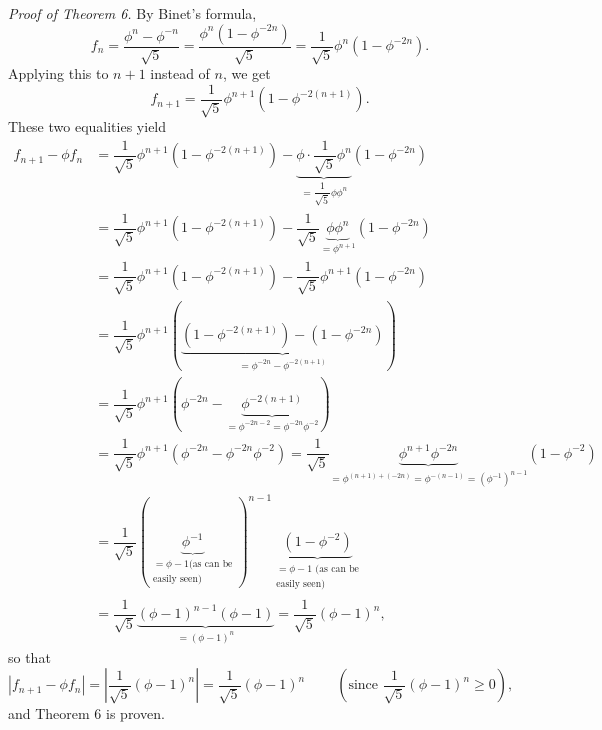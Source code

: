 \documentclass[numbers=enddot,12pt,final,onecolumn,notitlepage]{scrartcl}%
\numberwithin{exer}{section}
\theoremstyle{definition}
\begin{document}
\textit{Proof of Theorem 6.} By Binet's formula,%
\[
f_{n}=\dfrac{\phi^{n}-\phi^{-n}}{\sqrt{5}}=\dfrac{\phi^{n}\left(  1-\phi
^{-2n}\right)  }{\sqrt{5}}=\dfrac{1}{\sqrt{5}}\phi^{n}\left(  1-\phi
^{-2n}\right)  .
\]
Applying this to $n+1$ instead of $n$, we get%
\[
f_{n+1}=\dfrac{1}{\sqrt{5}}\phi^{n+1}\left(  1-\phi^{-2\left(  n+1\right)
}\right)  .
\]
These two equalities yield%
\begin{align*}
f_{n+1}-\phi f_{n}  &  =\dfrac{1}{\sqrt{5}}\phi^{n+1}\left(  1-\phi^{-2\left(
n+1\right)  }\right)  -\underbrace{\phi\cdot\dfrac{1}{\sqrt{5}}\phi^{n}%
}_{=\dfrac{1}{\sqrt{5}}\phi\phi^{n}}\left(  1-\phi^{-2n}\right) \\
&  =\dfrac{1}{\sqrt{5}}\phi^{n+1}\left(  1-\phi^{-2\left(  n+1\right)
}\right)  -\dfrac{1}{\sqrt{5}}\underbrace{\phi\phi^{n}}_{=\phi^{n+1}}\left(
1-\phi^{-2n}\right) \\
&  =\dfrac{1}{\sqrt{5}}\phi^{n+1}\left(  1-\phi^{-2\left(  n+1\right)
}\right)  -\dfrac{1}{\sqrt{5}}\phi^{n+1}\left(  1-\phi^{-2n}\right) \\
&  =\dfrac{1}{\sqrt{5}}\phi^{n+1}\left(  \underbrace{\left(  1-\phi^{-2\left(
n+1\right)  }\right)  -\left(  1-\phi^{-2n}\right)  }_{=\phi^{-2n}%
-\phi^{-2\left(  n+1\right)  }}\right) \\
&  =\dfrac{1}{\sqrt{5}}\phi^{n+1}\left(  \phi^{-2n}-\underbrace{\phi
^{-2\left(  n+1\right)  }}_{=\phi^{-2n-2}=\phi^{-2n}\phi^{-2}}\right) \\
&  =\dfrac{1}{\sqrt{5}}\phi^{n+1}\left(  \phi^{-2n}-\phi^{-2n}\phi
^{-2}\right)  =\dfrac{1}{\sqrt{5}}\underbrace{\phi^{n+1}\phi^{-2n}}%
_{=\phi^{\left(  n+1\right)  +\left(  -2n\right)  }=\phi^{-\left(  n-1\right)
}=\left(  \phi^{-1}\right)  ^{n-1}}\left(  1-\phi^{-2}\right) \\
&  =\dfrac{1}{\sqrt{5}}\left(  \underbrace{\phi^{-1}}_{\substack{=\phi-1\text{
(as can be}\\\text{easily seen)}}}\right)  ^{n-1}\underbrace{\left(
1-\phi^{-2}\right)  }_{\substack{=\phi-1\text{ (as can be}\\\text{easily
seen)}}}\\
&  =\dfrac{1}{\sqrt{5}}\underbrace{\left(  \phi-1\right)  ^{n-1}\left(
\phi-1\right)  }_{=\left(  \phi-1\right)  ^{n}}=\dfrac{1}{\sqrt{5}}\left(
\phi-1\right)  ^{n},
\end{align*}
so that%
\[
\left\vert f_{n+1}-\phi f_{n}\right\vert =\left\vert \dfrac{1}{\sqrt{5}%
}\left(  \phi-1\right)  ^{n}\right\vert =\dfrac{1}{\sqrt{5}}\left(
\phi-1\right)  ^{n}\ \ \ \ \ \ \ \ \ \ \left(  \text{since }\dfrac{1}{\sqrt
{5}}\left(  \phi-1\right)  ^{n}\geq0\right)  ,
\]
and Theorem 6 is proven.
\end{document}
